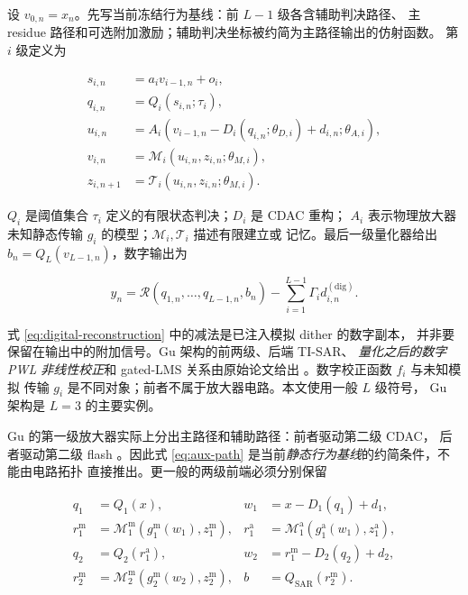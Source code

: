 \documentclass[11pt,a4paper]{ctexart}
\theoremstyle{adcplain}
\theoremstyle{definition}
\begin{document}
设 $v_{0,n}=x_n$。先写当前冻结行为基线：前 $L-1$ 级各含辅助判决路径、
主 residue 路径和可选附加激励；辅助判决坐标被约简为主路径输出的仿射函数。
第 $i$ 级定义为

\begin{align}
  s_{i,n} &= a_i v_{i-1,n}+o_i, \label{eq:aux-path}\\
  q_{i,n} &= Q_i(s_{i,n};\tau_i), \label{eq:stage-decision}\\
  u_{i,n} &= A_i\!\left(v_{i-1,n}
                -D_i(q_{i,n};\theta_{D,i})+d_{i,n};
                \theta_{A,i}\right), \label{eq:static-residue-target}\\
  v_{i,n} &= \mathcal M_i(u_{i,n},z_{i,n};\theta_{M,i}), \label{eq:dynamic-residue}\\
  z_{i,n+1} &= \mathcal T_i(u_{i,n},z_{i,n};\theta_{M,i}). \label{eq:stage-state}
\end{align}

$Q_i$ 是阈值集合 $\tau_i$ 定义的有限状态判决；$D_i$ 是 CDAC 重构；
$A_i$ 表示物理放大器未知静态传输 $g_i$ 的模型；$\mathcal M_i,\mathcal T_i$ 描述有限建立或
记忆。最后一级量化器给出 $b_n=Q_L(v_{L-1,n})$，数字输出为

\begin{equation}
  y_n=\mathcal R(q_{1,n},\ldots,q_{L-1,n},b_n)
      -\sum_{i=1}^{L-1}\Gamma_i d_{i,n}^{(\mathrm{dig})}.
  \label{eq:digital-reconstruction}
\end{equation}

式 \eqref{eq:digital-reconstruction} 中的减法是已注入模拟 dither 的数字副本，
并非要保留在输出中的附加信号。Gu 架构的前两级、后端 TI-SAR、
\emph{量化之后的数字 PWL 非线性校正}和 gated-LMS 关系由原始论文给出
\cite{Gu2026PipelinedADC,Gu2025GatedLMS}。数字校正函数 $f_i$ 与未知模拟
传输 $g_i$ 是不同对象；前者不属于放大器电路。本文使用一般 $L$ 级符号，
Gu 架构是 $L=3$ 的主要实例。

Gu 的第一级放大器实际上分出主路径和辅助路径：前者驱动第二级 CDAC，
后者驱动第二级 flash \cite{Gu2026PipelinedADC}。因此式
\eqref{eq:aux-path} 是当前\emph{静态行为基线}的约简条件，不能由电路拓扑
直接推出。更一般的两级前端必须分别保留

\begin{align}
  q_1&=Q_1(x), &w_1&=x-D_1(q_1)+d_1,\\
  r_1^{\mathrm m}&=\mathcal M_1^{\mathrm m}
    \!\left(g_1^{\mathrm m}(w_1),z_1^{\mathrm m}\right), &
  r_1^{\mathrm a}&=\mathcal M_1^{\mathrm a}
    \!\left(g_1^{\mathrm a}(w_1),z_1^{\mathrm a}\right),\\
  q_2&=Q_2(r_1^{\mathrm a}), &
  w_2&=r_1^{\mathrm m}-D_2(q_2)+d_2,\\
  r_2^{\mathrm m}&=\mathcal M_2^{\mathrm m}
    \!\left(g_2^{\mathrm m}(w_2),z_2^{\mathrm m}\right), &
  b&=Q_{\mathrm{SAR}}(r_2^{\mathrm m}).
  \label{eq:dual-path-signal-chain}
\end{align}
\end{document}
